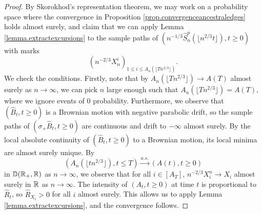 \begin{proof}
By Skorokhod's representation theorem, we may work on a probability space where the convergence in Proposition \ref{prop.convergenceancestraledges} holds almost surely, and claim that we can apply Lemma \ref{lemma.extractexcursions} to the sample paths of $\left(n^{-1/3}\hat{S}^{p}_n\left(\lfloor n^{2/3}t\rfloor\right),t \geq 0\right)$ with marks $$\left(n^{-2/3}X_n^i\right)_{1\leq i\leq A_n\left(\lfloor T n^{2/3}\rfloor\right)}.$$ We check the conditions.
Firstly, note that by $A_n\left(\lfloor T n^{2/3}\rfloor\right)\to A\left(T\right)$ almost surely as $n\to \infty$, we can pick $n$ large enough such that $A_n\left(\lfloor T n^{2/3}\rfloor\right)=A\left(T\right)$, where we ignore events of $0$ probability. Furthermore, we observe that $(\hat{B}_t,t\geq 0)$ is a Brownian motion with negative parabolic drift, so the sample paths of $(\sigma_+\hat{B}_t,t\geq 0)$ are continuous and drift to $-\infty$ almost surely. By the local absolute continuity of $(\hat{B}_t,t\geq 0)$ to a Brownian motion, its local minima are almost surely unique. By 
$$\left(A_n\left(\lfloor t n^{2/3}\rfloor\right), t\leq T\right) \overset{a.s.}{\to}\left(A\left(t\right),t\geq 0\right)$$
in ${\mathbb D}({\mathbb R}_+,{\mathbb R})$ as $n\to \infty$, we observe that for all $i\in [A_T]$, $n^{-2/3}X_i^n\to X_i$ almost surely in ${\mathbb R}$ as $n\to \infty$. The intensity of $(A_t,t\geq 0)$ at time $t$ is proportional to $\hat{R}_t$, so $\hat{R}_{X_i}>0$ for all $i$ almost surely. This allows us to apply Lemma \ref{lemma.extractexcursions}, and the convergence follows.
\end{proof}

